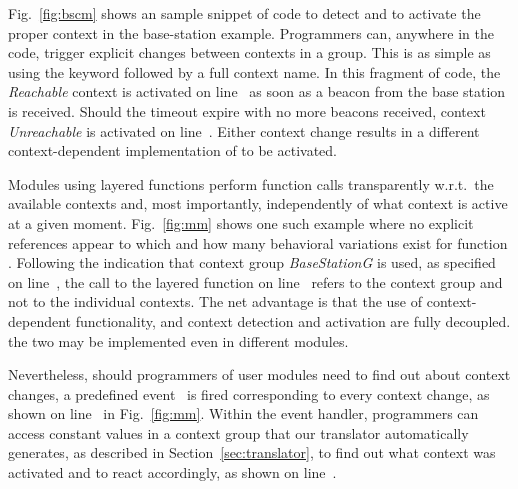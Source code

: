 Fig.~\ref{fig:bscm} shows an sample snippet of code to detect and to
activate the proper context in the base-station example. Programmers
can, anywhere in the code, trigger explicit changes between contexts
in a group. This is as simple as using the  keyword
followed by a full context name. In this fragment of code, the
\emph{Reachable} context is activated on line~ as soon
as a beacon from the base station is received. Should the timeout
expire with no more beacons received, context \emph{Unreachable} is
activated on line~. Either context change results in a
different context-dependent implementation of  to be
activated.


Modules using layered functions perform function calls transparently
w.r.t.\ the available contexts and, most importantly, independently of
what context is active at a given moment. Fig.~\ref{fig:mm} shows one
such example where no explicit references appear to which and how many
behavioral variations exist for function . Following the
indication that context group \emph{BaseStationG} is used, as
specified on line~, the call to the layered function
 on line~ refers to the context group and
not to the individual contexts. The net advantage is that the use of
context-dependent functionality, and context detection and activation
are fully decoupled. the two may be implemented even in different
modules.


Nevertheless, should programmers of user modules need to find out
about context changes, a predefined event~ is
fired corresponding to every context change, as shown on
line~ in Fig.~\ref{fig:mm}. %
Within the event handler, programmers can access constant values in a
context group that our translator automatically generates, as
described in Section~\ref{sec:translator}, to find out what context
was activated and to react accordingly, as shown on
line~.



